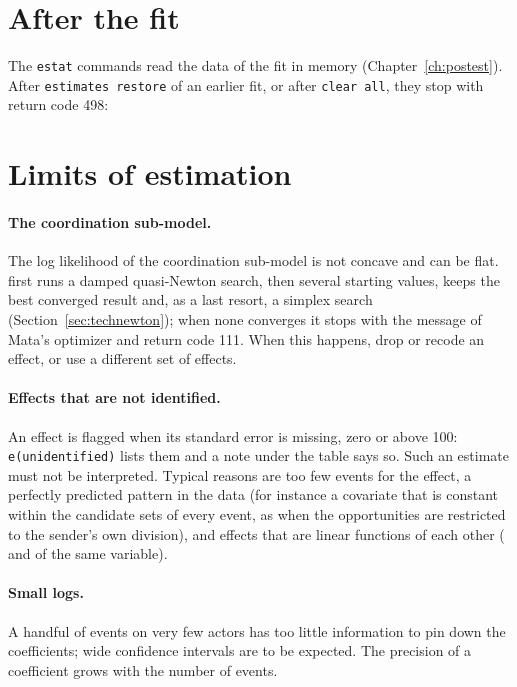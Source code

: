 \section{After the fit}\label{sec:limits_estat}

The \texttt{estat} commands read the data of the fit in memory (Chapter~\ref{ch:postest}). After \texttt{estimates restore} of an earlier fit, or after \texttt{clear all}, they stop with return code 498:

\section{Limits of estimation}

\paragraph{The coordination sub-model.} The log likelihood of the coordination sub-model is not concave and can be flat. \nwdynam{} first runs a damped quasi-Newton search, then several starting values, keeps the best converged result and, as a last resort, a simplex search (Section~\ref{sec:technewton}); when none converges it stops with the message of Mata's optimizer and return code 111. When this happens, drop or recode an effect, or use a different set of effects.

\paragraph{Effects that are not identified.} An effect is flagged when its standard error is missing, zero or above 100: \texttt{e(unidentified)} lists them and a note under the table says so. Such an estimate must not be interpreted. Typical reasons are too few events for the effect, a perfectly predicted pattern in the data (for instance a covariate that is constant within the candidate sets of every event, as  when the opportunities are restricted to the sender's own division), and effects that are linear functions of each other ( and  of the same variable).

\paragraph{Small logs.} A handful of events on very few actors has too little information to pin down the coefficients; wide confidence intervals are to be expected. The precision of a coefficient grows with the number of events.

